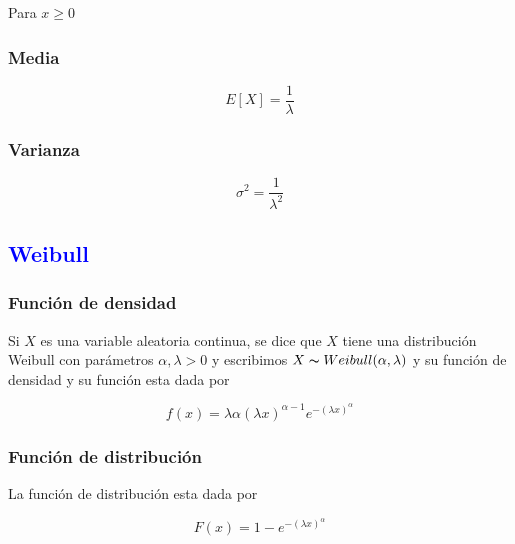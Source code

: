 \documentclass{article}
\begin{document}
\begin{multicols}{2}
                Para $x\geq 0$ 

            \subsubsection{Media}

                \begin{equation*}
                    E[X] = \frac{1}{\lambda}
                \end{equation*}
                
            \subsubsection{Varianza}

                \begin{equation*}
                    \sigma ^2 = \frac{1}{\lambda ^2}
                \end{equation*}
            

        \subsection{\textcolor{blue}{Weibull}}

            \subsubsection{Función de densidad}

                Si $X$ es una variable aleatoria continua, se dice que $X$ tiene una distribución Weibull con parámetros $\alpha, \lambda >0$ y escribimos $X\thicksim Weibull(\alpha, \lambda)$ y su función de densidad y su función esta dada por

                    \begin{equation*}
                        f(x)= \lambda \alpha (\lambda x)^{\alpha -1} e^{-(\lambda x)^\alpha}
                    \end{equation*}

            \subsubsection{Función de distribución}

                La función de distribución esta dada por

                    \begin{equation*}
                        F(x) = 1-e^{-(\lambda x)^{\alpha}}
                    \end{equation*}


\end{multicols}
\end{document}
